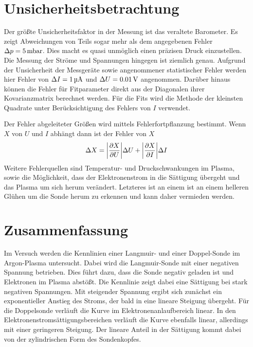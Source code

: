 \section{Unsicherheitsbetrachtung}
Der gr\"o\ss te Unsicherheitsfaktor in der Messung ist das veraltete Barometer.
Es zeigt Abweichungen von Teils sogar mehr als dem angegebenen Fehler $\Delta p=\SI{5}{\milli\bar}$.
Dies macht es quasi unm\"oglich einen pr\"azisen Druck einzustellen.
Die Messung der Str\"ome und Spannungen hingegen ist ziemlich genau.
Aufgrund der Unsicherheit der Messger\"ate sowie angenommener statistischer Fehler werden hier Fehler von $\Delta I=\SI{1}{\micro\ampere}$ und $\Delta U=\SI{0.01}{\volt}$ angenommen.
Dar\"uber hinaus k\"onnen die Fehler f\"ur Fitparameter direkt aus der Diagonalen ihrer Kovarianzmatrix berechnet werden.
F\"ur die Fits wird die Methode der kleinsten Quadrate unter Ber\"ucksichtigung des Fehlers von $I$ verwendet.

Der Fehler abgeleiteter Gr\"o\ss en wird mittels Fehlerfortpflanzung bestimmt.
Wenn $X$ von $U$ und $I$ abh\"angt dann ist der Fehler von $X$
\begin{equation}
\Delta X = \abs{\frac{\partial X}{\partial U}}\Delta U +  \abs{\frac{\partial X}{\partial I}}\Delta I
\label{eq:err}
\end{equation}
Weitere Fehlerquellen sind Temperatur- und Druckschwankungen im Plasma, sowie die M\"oglichkeit, dass der Elektronenstrom in die S\"attigung \"ubergeht und das Plasma um sich herum ver\"andert.
Letzteres ist an einem ist an einem helleren Gl\"uhen um die Sonde herum zu erkennen und kann daher vermieden werden.

\section{Zusammenfassung}
Im Versuch werden die Kennlinien einer Langmuir- und einer Doppel-Sonde im Argon-Plasma untersucht.
Dabei wird die Langmuir-Sonde mit einer negativen Spannung betrieben.
Dies f\"uhrt dazu, dass die Sonde negativ geladen ist und Elektronen im Plasma abst\"o\ss t.
Die Kennlinie zeigt dabei eine S\"attigung bei stark negativen Spannungen.
Mit steigender Spannung ergibt sich zun\"achst ein exponentieller Anstieg des Stroms, der bald in eine lineare Steigung \"ubergeht.
F\"ur die Doppelsonde verl\"auft die Kurve im Elektronenanlaufbereich linear.
In den Elektronenstroms\"attigungsbereichen verl\"auft die Kurve ebenfalls linear, allerdings mit einer geringeren Steigung.
Der lineare Anteil in der S\"attigung kommt dabei von der zylindrischen Form des Sondenkopfes.

